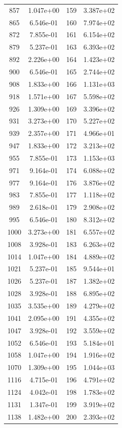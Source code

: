 \documentclass[12pt]{article}
\begin{document}
\begin{longtable}{@{}cccc@{}}
857 & 1.047e+00 & 159 & 3.387e+02 \\
865 & 6.546e-01 & 160 & 7.974e+02 \\
872 & 7.855e-01 & 161 & 6.154e+02 \\
879 & 5.237e-01 & 163 & 6.393e+02 \\
892 & 2.226e+00 & 164 & 1.423e+02 \\
900 & 6.546e-01 & 165 & 2.744e+02 \\
908 & 1.833e+00 & 166 & 1.131e+03 \\
918 & 1.571e+00 & 167 & 5.598e+02 \\
926 & 1.309e+00 & 169 & 3.396e+02 \\
931 & 3.273e+00 & 170 & 5.227e+02 \\
939 & 2.357e+00 & 171 & 4.966e+01 \\
947 & 1.833e+00 & 172 & 3.213e+02 \\
955 & 7.855e-01 & 173 & 1.153e+03 \\
971 & 9.164e-01 & 174 & 6.088e+02 \\
977 & 9.164e-01 & 176 & 3.876e+02 \\
983 & 7.855e-01 & 177 & 1.118e+02 \\
989 & 2.618e-01 & 179 & 2.908e+02 \\
995 & 6.546e-01 & 180 & 8.312e+02 \\
1000 & 3.273e+00 & 181 & 6.557e+02 \\
1008 & 3.928e-01 & 183 & 6.263e+02 \\
1014 & 1.047e+00 & 184 & 4.889e+02 \\
1021 & 5.237e-01 & 185 & 9.544e+01 \\
1026 & 5.237e-01 & 187 & 1.382e+02 \\
1028 & 3.928e-01 & 188 & 6.895e+02 \\
1035 & 3.535e+00 & 189 & 4.279e+02 \\
1041 & 2.095e+00 & 191 & 4.355e+02 \\
1047 & 3.928e-01 & 192 & 3.559e+02 \\
1052 & 6.546e-01 & 193 & 5.184e+01 \\
1058 & 1.047e+00 & 194 & 1.916e+02 \\
1070 & 1.309e+00 & 195 & 1.044e+03 \\
1116 & 4.715e-01 & 196 & 4.791e+02 \\
1124 & 4.042e-01 & 198 & 1.783e+02 \\
1131 & 1.347e-01 & 199 & 3.919e+02 \\
1138 & 1.482e+00 & 200 & 2.393e+02 \\

\end{longtable}
\end{document}
